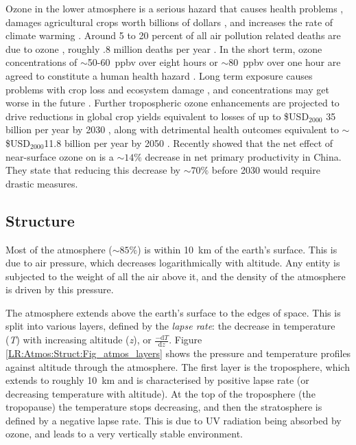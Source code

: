   Ozone in the lower atmosphere is a serious hazard that causes health problems \parencite{Hsieh2013}, damages agricultural crops worth billions of dollars \parencite{Avnery2011,Yue2017}, and increases the rate of climate warming \parencite{IPCC_2013_chap8}.
  Around 5 to 20 percent of all air pollution related deaths are due to ozone \parencite{Monks2015}, roughly .8 million deaths per year \parencite{Lelieveld2013}.
  In the short term, ozone concentrations of $\sim$50-60~ppbv over eight hours or $\sim$80~ppbv over one hour are agreed to constitute a human health hazard \parencite{Ayers2006,Lelieveld2009}. 
  Long term exposure causes problems with crop loss and ecosystem damage \parencite{Emberson2003}, and concentrations may get worse in the future \parencite{Lelieveld2009, Stevenson2013}.
  Further tropospheric ozone enhancements are projected to drive reductions in global crop yields equivalent to losses of up to \$USD$_{2000}$ 35 billion per year by 2030 \parencite{Avnery2011}, along with detrimental health outcomes equivalent to $\sim$\$USD$_{2000}$11.8 billion per year by 2050 \parencite{Selin2009}.
  Recently \textcite{Yue2017} showed that the net effect of near-surface ozone on is a $\sim 14\%$ decrease in net primary productivity in China.
  They state that reducing this decrease by $\sim 70\%$ before 2030 would require drastic measures.
  
  
  \subsection{Structure}
  \label{LR:Atmos:Struct}
    
    Most of the atmosphere ($\sim 85\%$) is within 10~km of the earth's surface.
    This is due to air pressure, which decreases logarithmically with altitude.
    Any entity is subjected to the weight of all the air above it, and the density of the atmosphere is driven by this pressure.
    
    The atmosphere extends above the earth's surface to the edges of space. 
    This is split into various layers, defined by the \textit{lapse rate}: the decrease in temperature (\textit{T}) with increasing altitude (\textit{z}), or $\frac{-\textrm{d}T}{\textrm{d}z}$.
    Figure \ref{LR:Atmos:Struct:Fig_atmos_layers} shows the pressure and temperature profiles against altitude through the atmosphere.
    The first layer is the troposphere, which extends to roughly 10~km and is characterised by positive lapse rate (or decreasing temperature with altitude).
    At the top of the troposphere (the tropopause) the temperature stops decreasing, and then the stratosphere is defined by a negative lapse rate.
    This is due to UV radiation being absorbed by ozone, and leads to a very vertically stable environment.
    
